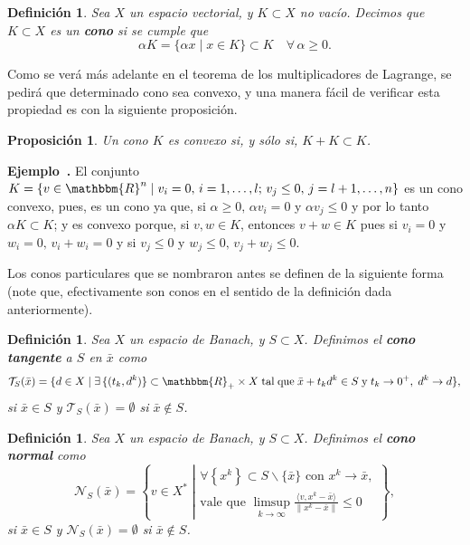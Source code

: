 \documentclass[a4paper,10pt]{book}
\newcommand{\R}{\mathbbm{R}}
\newcommand{\Rn}{\R^n}
\newcommand{\arr}{\rightarrow}
\newcommand{\bx}{\bar{x}}
\newcommand{\cN}{\mathcal{N}}
\newcommand{\cT}{\mathcal{T}}
\newtheorem{prop}[teo]{Proposici\'on}
\newtheorem{defi}[teo]{Definici\'on}
\newcounter{ejem}[section]
\newenvironment{ejem}[1][]{\refstepcounter{ejem}\par\medskip
   \noindent \textbf{Ejemplo~\theejem. #1} \rmfamily}{\medskip}
\begin{document}
\begin{defi}
Sea $X$ un espacio vectorial, y $K\subset X$ no vacío. Decimos que $K\subset X$ es un \textbf{cono} si se cumple que $$\alpha K=\{\alpha x\mid x\in K\}\subset K\quad\forall\,\alpha\geq 0.$$ 
\end{defi} 

Como se verá más adelante en el teorema de los multiplicadores de Lagrange, se pedirá que determinado cono sea convexo, y una manera fácil de verificar esta propiedad es con la siguiente proposición.

\begin{prop}
 Un cono $K$ es convexo si, y sólo si, $K+K\subset K$.
\end{prop}

\begin{ejem}
El conjunto $K=\{v\in\Rn \mid v_i=0,\,i=1,\ldots,l;\,v_j\leq0,\, j=l+1,\ldots,n\}$ es un cono convexo, pues, es un cono ya que, si $\alpha\geq0,\,\alpha v_i=0$ y $\alpha v_j\leq0$ y por lo tanto $\alpha K\subset K$; y es convexo porque, si $v,w\in K$, entonces $v+w\in K$ pues si $v_i=0$ y $w_i=0,\,v_i+w_i=0$ y si $v_j\leq0$ y $w_j\leq0,\, v_j+w_j\leq0$.
 
\end{ejem}


Los conos particulares que se nombraron antes se definen de la siguiente forma (note que, efectivamente son conos en el sentido de la definición dada anteriormente).

\begin{defi}
Sea $X$ un espacio de Banach, y $S\subset X$. Definimos el \textbf{cono tangente} a $S$ en $\bx$ como
$$\cT_{S} (\bx)=\{d\in X\mid\exists\,\{(t_{k},d^k)\}\subset\R_+\times X\;\mathrm{tal\; que}\;\bx+t_{k}d^k\in S\;\mathrm{y}\;t_{k}\arr 0^+,\;d^k\arr d\},$$ si $\bx\in S$ y $\cT_{S}(\bx)=\emptyset$ si $\bx\notin S$.
\end{defi}

\begin{defi}
Sea $X$ un espacio de Banach, y $S\subset X$. Definimos el \textbf{cono normal} como 
$$\cN_{S}(\bx)=\left\{v\in X^*\;\left|\begin{array}{c}
\forall\left\{x^k\right\}\subset S\backslash\{\bx\}\mbox{ con } x^k\arr\bx,\\
\mbox{vale que }\displaystyle\limsup_{k\arr\infty}\frac{\langle v,x^k-\bx\rangle}{\|x^k-\bx\|}\leq 0\end{array}\right.\right\},$$
si $\bx\in S$ y $\mathcal{N}_{S}(\bx)=\emptyset$ si $\bx\notin S$.
\end{defi}
\end{document}
